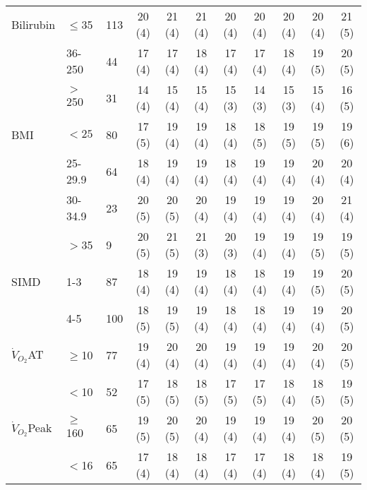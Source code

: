 \begin{sidewaystable}[p]
\begin{tabular}{|l ll | c c c c c c c c|}
		Bilirubin           & $\leq$35  & 113   & 20 (4)    & 21 (4)    & 21 (4)    & 20 (4)    & 20 (4)    & 20 (4)    & 20 (4)    & 21 (5)    \\
		                    & 36-250    & 44    & 17 (4)    & 17 (4)    & 18 (4)    & 17 (4)    & 17 (4)    & 18 (4)    & 19 (5)    & 20 (5)    \\
		                    & $>$250    & 31    & 14 (4)    & 15 (4)    & 15 (4)    & 15 (3)    & 14 (3)    & 15 (3)    & 15 (4)    & 16 (5)    \\
		BMI                 & $<25$     & 80    & 17 (5)    & 19 (4)    & 19 (4)    & 18 (4)    & 18 (5)    & 19 (5)    & 19 (5)    & 19 (6)    \\
		                    & 25-29.9   & 64    & 18 (4)    & 19 (4)    & 19 (4)    & 18 (4)    & 19 (4)    & 19 (4)    & 20 (4)    & 20 (4)    \\
		                    & 30-34.9   & 23    & 20 (5)    & 20 (5)    & 20 (4)    & 19 (4)    & 19 (4)    & 19 (4)    & 20 (4)    & 21 (4)    \\
		                    & $>$35     & 9     & 20 (5)    & 21 (5)    & 21 (3)    & 20 (3)    & 19 (4)    & 19 (4)    & 19 (5)    & 19 (5)    \\
		SIMD                & 1-3       & 87    & 18 (4)    & 19 (4)    & 19 (4)    & 18 (4)    & 18 (4)    & 19 (4)    & 19 (5)    & 20 (5)    \\
		                    & 4-5       & 100   & 18 (5)    & 19 (5)    & 19 (4)    & 18 (4)    & 18 (4)    & 19 (4)    & 19 (4)    & 20 (5)    \\
		$\dot{V}_{O_2}$AT   & $\geq$10  & 77    & 19 (4)    & 20 (4)    & 20 (4)    & 19 (4)    & 19 (4)    & 19 (4)    & 20 (4)    & 20 (5)    \\
		                    & $<$10     & 52    & 17 (5)    & 18 (5)    & 18 (5)    & 17 (5)    & 17 (5)    & 18 (4)    & 18 (5)    & 19 (5)    \\
		$\dot{V}_{O_2}$Peak & $\geq$160 & 65    & 19 (5)    & 20 (5)    & 20 (4)    & 19 (4)    & 19 (4)    & 19 (4)    & 20 (5)    & 20 (5)    \\
		                    & $<$16     & 65    & 17 (4)    & 18 (4)    & 18 (4)    & 17 (4)    & 17 (4)    & 18 (4)    & 18 (4)    & 19 (5)    \\

\end{tabular}
\end{sidewaystable}
